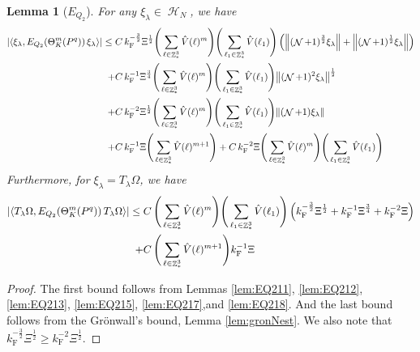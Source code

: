 \documentclass[12pt,a4paper]{article}
\numberwithin{equation}{section}
\newcommand{\1}{\mathbb{I}}
\newcommand{\F}{\mathrm{F}}
\DeclareMathOperator{\Z}{\mathbb{Z}}
\DeclareMathOperator{\HH}{\mathcal{H}}
\DeclareMathOperator{\NN}{\mathcal{N}}
\newcommand{\half}{\frac{1}{2}}
\newcommand{\eva}[1]{\left\langle #1 \right\rangle}
\theoremstyle{plain}
\newtheorem{lemma}[theorem]{Lemma}
\theoremstyle{definition}
\theoremstyle{remark}
\theoremstyle{plain}
\theoremstyle{definition}
\theoremstyle{remark}
\begin{document}
\begin{lemma}[$E_{Q_2}$]\label{lem:finEQ2est}
    For any $\xi_\lambda \in \HH_N$, we have
    \begin{align}
    	\abs{\eva{\xi_\lambda, E_{Q_2}\!\left(\Theta^m_K(P^q)\right)  \xi_\lambda}} \leq \; &C\,  k_{\F}^{-\frac{3}{2}} \Xi^\half \Bigg(\sum\limits_{\ell \in \Z^3_*} \hat{V}(\ell)^m\Bigg)\Bigg( \sum\limits_{\ell_1 \in \Z^3_*} \hat{V}(\ell_1) \Bigg) \left(\norm { (\NN+1)^{\frac{3}{2}} \xi_\lambda } + \norm { (\NN+1)^{\frac{1}{2}} \xi_\lambda } \right)\nonumber\\
    	\quad+ &C\, k_{\F}^{-1}\Xi^{\frac{3}{4}} \Bigg(\sum\limits_{\ell \in \Z^3_*} \hat{V}(\ell)^m\Bigg) \Bigg(\sum\limits_{\ell_1 \in \Z^3_*} \hat{V}(\ell_1) \Bigg)  \norm{ (\NN+1)^2\xi_\lambda}^\half \nonumber\\ 
    	\quad+ &C\, k_{\F}^{-2}\Xi^{\frac{1}{2}} \Bigg(\sum\limits_{\ell \in \Z^3_*} \hat{V}(\ell)^m\Bigg) \Bigg(\sum\limits_{\ell_1 \in \Z^3_*} \hat{V}(\ell_1) \Bigg)  \norm{ (\NN+1)\xi_\lambda} \nonumber\\
    	\quad+ &C\, k_{\F}^{-1}\Xi \Bigg(\sum\limits_{\ell \in \Z^3_*} \hat{V}(\ell)^{m+1}\Bigg) + C\, k_{\F}^{-2}\Xi \Bigg(\sum\limits_{\ell \in \Z^3_*} \hat{V}(\ell)^m\Bigg) \Bigg(\sum\limits_{\ell_1 \in \Z^3_*} \hat{V}(\ell_1) \Bigg) \label{eq:genEQ2est}
    \end{align}
    Furthermore, for $\xi_\lambda = T_{\lambda}\Omega$, we have 
    \begin{align}
    	\abs{\eva{ T_{\lambda}\Omega, E_{Q_2}\!\left(\Theta^m_K(P^q) \right)  T_{\lambda}\Omega}} \leq \; &C\,  \Bigg(\sum\limits_{\ell \in \Z^3_*} \hat{V}(\ell)^m\Bigg)\Bigg( \sum\limits_{\ell_1 \in \Z^3_*} \hat{V}(\ell_1) \Bigg)\left( k_{\F}^{-\frac{3}{2}} \Xi^\half 
    	+ k_{\F}^{-1}\Xi^{\frac{3}{4}} + k_{\F}^{-2}\Xi \right)\nonumber\\
    	\quad + &C\, \Bigg(\sum\limits_{\ell \in \Z^3_*} \hat{V}(\ell)^{m+1}\Bigg)  k_{\F}^{-1}\Xi \label{eq:finalEQ2est}
    \end{align}
\end{lemma}
\begin{proof}
    	The first bound follows from Lemmas \ref{lem:EQ211}, \ref{lem:EQ212}, \ref{lem:EQ213}, \ref{lem:EQ215}, \ref{lem:EQ217},and \ref{lem:EQ218}. And the last bound follows from the Gr\"onwall's bound, Lemma \ref{lem:gronNest}. We also note that $k_{\F}^{-\frac{3}{2}} \Xi^\half 
    	\geq k_{\F}^{-2} \Xi^\half $. 
\end{proof}
\end{document}
